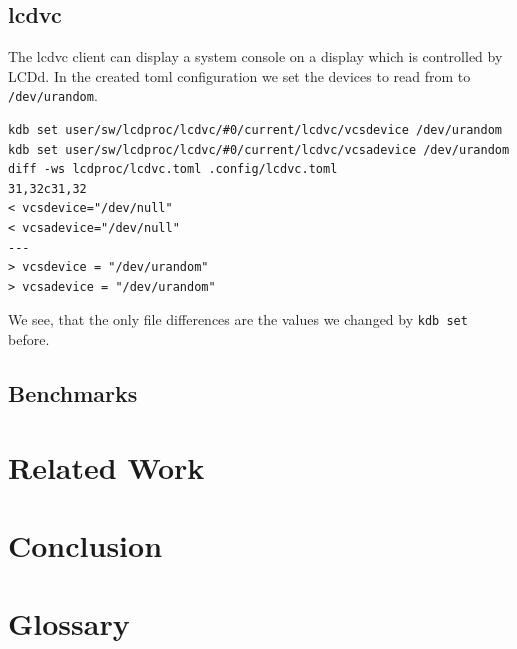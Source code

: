 \documentclass[12pt]{report}
\begin{document}
\section{lcdvc}
The lcdvc client can display a system console on a display which is controlled by LCDd.
In the created \acrshort{toml} configuration we set the devices to read from to \texttt{/dev/urandom}.
{\small
\begin{verbatim}
kdb set user/sw/lcdproc/lcdvc/#0/current/lcdvc/vcsdevice /dev/urandom
kdb set user/sw/lcdproc/lcdvc/#0/current/lcdvc/vcsadevice /dev/urandom
diff -ws lcdproc/lcdvc.toml .config/lcdvc.toml
31,32c31,32
< vcsdevice="/dev/null"
< vcsadevice="/dev/null"
---
> vcsdevice = "/dev/urandom"
> vcsadevice = "/dev/urandom"
\end{verbatim}
}
We see, that the only file differences are the values we changed by \texttt{kdb set} before.



\section{Benchmarks}


\chapter{Related Work}

\chapter{Conclusion}

\chapter{Glossary}

\printglossary[type=\acronymtype]

{}

\end{document}
